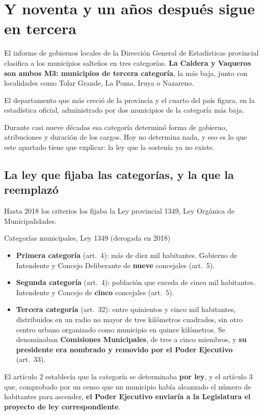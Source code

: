 \section{Y noventa y un años después sigue en tercera}

El informe de gobiernos locales de la Dirección General de Estadísticas provincial clasifica a los municipios salteños en tres categorías. \textbf{La Caldera y Vaqueros son ambos M3: municipios de tercera categoría}, la más baja, junto con localidades como Tolar Grande, La Poma, Iruya o Nazareno.

\begin{cautela}
El departamento que más creció de la provincia y el cuarto del país figura, en la estadística oficial, administrado por dos municipios de la categoría más baja.

Durante casi nueve décadas esa categoría determinó forma de gobierno, atribuciones y duración de los cargos. Hoy no determina nada, y eso es lo que este apartado tiene que explicar: la ley que la sostenía ya no existe.
\end{cautela}

\subsection*{La ley que fijaba las categorías, y la que la reemplazó}

Hasta 2018 los criterios los fijaba la Ley provincial 1349, Ley Orgánica de Municipalidades.

\begin{ficha}{Categorías municipales, Ley 1349 (derogada en 2018)}
\begin{itemize}[leftmargin=*,nosep]
\item \textbf{Primera categoría} (art.\ 4): más de diez mil habitantes. Gobierno de Intendente y Concejo Deliberante de \textbf{nueve} concejales (art.\ 5).
\item \textbf{Segunda categoría} (art.\ 4): población que exceda de cinco mil habitantes. Intendente y Concejo de \textbf{cinco} concejales (art.\ 5).
\item \textbf{Tercera categoría} (art.\ 32): entre quinientos y cinco mil habitantes, distribuidos en un radio no mayor de tres kilómetros cuadrados, sin otro centro urbano organizado como municipio en quince kilómetros. Se denominaban \textbf{Comisiones Municipales}, de tres a cinco miembros, y \textbf{su presidente era nombrado y removido por el Poder Ejecutivo} (art.\ 33).
\end{itemize}
El artículo 2 establecía que la categoría se determinaba \textbf{por ley}, y el artículo 3 que, comprobado por un censo que un municipio había alcanzado el número de habitantes para ascender, \textbf{el Poder Ejecutivo enviaría a la Legislatura el proyecto de ley correspondiente}.
\end{ficha}

